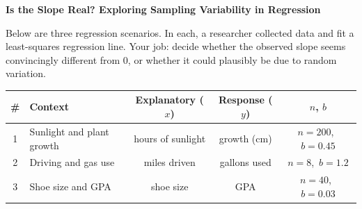 \documentclass[10pt]{article}
\begin{document}
\namepartnerperiod

\vspace{0.1in}
\textbf{Is the Slope Real? Exploring Sampling Variability in Regression}

\vspace{0.05in}
Below are three regression scenarios. In each, a researcher collected data and fit a
least-squares regression line. Your job: decide whether the observed slope seems
convincingly different from 0, or whether it could plausibly be due to random variation.

\vspace{0.1in}
\begin{center}
\renewcommand{\arraystretch}{1.4}
\begin{tabular}{clccc}
    \textbf{\#} & \textbf{Context} & \textbf{Explanatory ($x$)} & \textbf{Response ($y$)} & \textbf{$n$, $b$} \\
    \hline
    1 & Sunlight and plant growth & hours of sunlight & growth (cm) & $n=200$,\ $b=0.45$ \\
    2 & Driving and gas use       & miles driven      & gallons used & $n=8$,\ $b=1.2$ \\
    3 & Shoe size and GPA         & shoe size         & GPA & $n=40$,\ $b=0.03$ \\
\end{tabular}
\end{center}

\vspace{0.15in}
\end{document}
